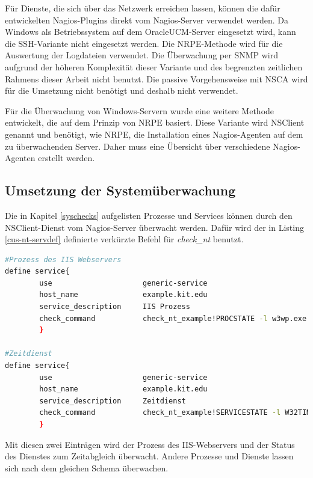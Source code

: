 Für Dienste, die sich über das Netzwerk erreichen lassen, können die dafür entwickelten Nagios-Plugins direkt vom Nagios-Server verwendet werden.
Da Windows als Betriebssystem auf dem \gls{OracleUCM}-Server eingesetzt wird, kann die \gls{SSH}-Variante nicht eingesetzt werden.
Die \gls{NRPE}-Methode wird für die Auswertung der Logdateien verwendet.
Die Überwachung per \gls{SNMP} wird aufgrund der höheren Komplexität dieser Variante und des begrenzten zeitlichen Rahmens dieser Arbeit nicht benutzt.
Die passive Vorgehensweise mit \gls{NSCA} wird für die Umsetzung nicht benötigt und deshalb nicht verwendet.

Für die Überwachung von Windows-Servern wurde eine weitere Methode entwickelt, die auf dem Prinzip von \gls{NRPE} basiert.
Diese Variante wird NSClient genannt und benötigt, wie \gls{NRPE}, die Installation eines Nagios-Agenten auf dem zu überwachenden Server.
Daher muss eine Übersicht über verschiedene Nagios-Agenten erstellt werden.



\subsection{Umsetzung der Systemüberwachung}

Die in Kapitel \ref{syschecks} aufgelisten Prozesse und Services können durch den NSClient-Dienst vom Nagios-Server überwacht werden.
Dafür wird der in Listing \ref{cus-nt-servdef} definierte verkürzte Befehl für \textit{check\_nt} benutzt.

\begin{lstlisting}[captionpos=b, caption=Prozess- und Service-Check Servicedefintionen, label=procservdef, breaklines = true, language=sh]
#Prozess des IIS Webservers
define service{
        use                     generic-service
        host_name               example.kit.edu
        service_description     IIS Prozess
        check_command           check_nt_example!PROCSTATE -l w3wp.exe
        }

#Zeitdienst
define service{
        use                     generic-service
        host_name               example.kit.edu
        service_description     Zeitdienst
        check_command           check_nt_example!SERVICESTATE -l W32TIME
        }
\end{lstlisting}

Mit diesen zwei Einträgen wird der Prozess des \gls{IIS}-Webservers und der Status des Dienstes zum Zeitabgleich überwacht.
Andere Prozesse und Dienste lassen sich nach dem gleichen Schema überwachen.

